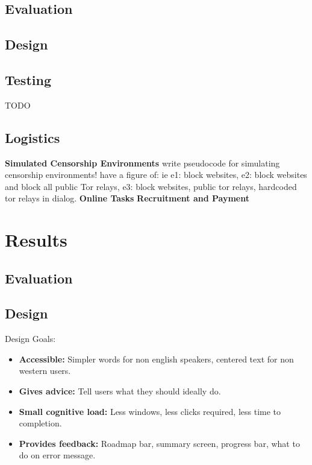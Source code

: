 \documentclass{template}
\begin{document}
\subsection{Evaluation}

\subsection{Design}

\subsection{Testing}
{\color {red} TODO}

\subsection{Logistics} 
{\bfseries Simulated Censorship Environments}
write pseudocode for simulating censorship environments! have a figure of: ie e1: block websites, e2: block websites and block all public Tor relays, e3: block websites, public tor relays, hardcoded tor relays in dialog. 
{\bfseries Online Tasks}
{\bfseries Recruitment and Payment} 

\section{Results} 

\subsection{Evaluation} 
\subsection{Design} 

Design Goals: 
\begin{itemize} \itemsep1pt \parskip0pt  
\item {\bfseries Accessible:} Simpler words for non english speakers, centered text for non western users.
\item {\bfseries Gives advice:} Tell users what they should ideally do. 
\item {\bfseries Small cognitive load:} Less windows, less clicks required, less time to completion. 
\item {\bfseries Provides feedback:} Roadmap bar, summary screen, progress bar, what to do on error message. 
\end{itemize}
\end{document}
